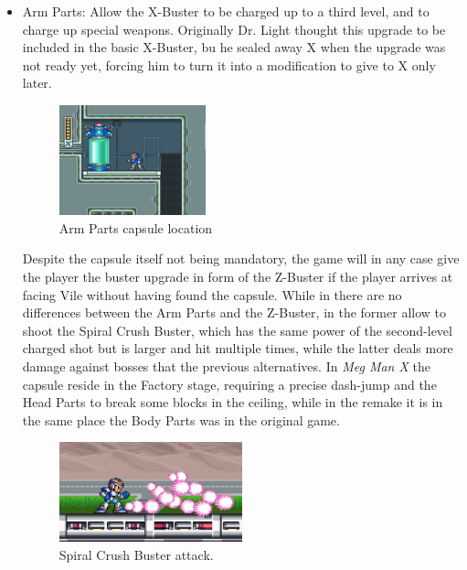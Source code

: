 \begin{itemize}
	\item Arm Parts: Allow the X-Buster to be charged up to a third level, and to charge up special weapons. Originally Dr. Light thought this upgrade to be included in the basic X-Buster\cite{X:Manual}, bu he sealed away X when the upgrade was not ready yet, forcing him to turn it into a modification to give to X only later.
	\begin{figure}[htp]
	\centering
	\includegraphics[width=0.4\textwidth]{figures/X1/Flame_mammoth/Flame_armor_2.jpg}
	\caption{Arm Parts capsule location}
	\end{figure}

	Despite the capsule itself not being mandatory, the game will in any case give the player the buster upgrade in form of the Z-Buster if the player arrives at facing Vile without having found the capsule. While in \x there are no differences between the Arm Parts and the Z-Buster, in \mhx the former allow to shoot the Spiral Crush Buster, which has the same power of the second-level charged shot but is larger and hit multiple times, while the latter deals more damage against bosses that the previous alternatives. In \textit{Meg Man X} the capsule reside in the Factory stage, requiring a precise dash-jump and the Head Parts to break some blocks in the ceiling, while in the remake it is in the same place the Body Parts was in the original game.
	\begin{figure}[htp]
		\centering
		\includegraphics[width=0.5\textwidth]{figures/X1/weapons/Buster_4.jpg}
		\caption{Spiral Crush Buster attack.}
	\end{figure}
	

\end{itemize}
